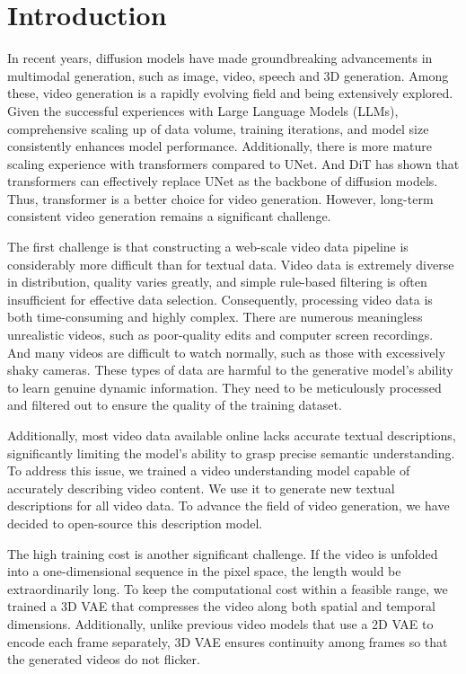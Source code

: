 \section{Introduction}

In recent years, diffusion models have made groundbreaking advancements in multimodal generation, such as image, video, speech and 3D generation. Among these, video generation is a rapidly evolving field and being extensively explored. Given the successful experiences with Large Language Models (LLMs), comprehensive scaling up of data volume, training iterations, and model size consistently enhances model performance. Additionally, there is more mature scaling experience with transformers compared to UNet. And DiT \citep{peebles2023scalable} has shown that transformers can effectively replace UNet as the backbone of diffusion models. Thus, transformer is a better choice for video generation.
However, long-term consistent video generation remains a significant challenge.  %

The first challenge is that constructing a web-scale video data pipeline is considerably more difficult than for textual data. Video data is extremely diverse in distribution, quality varies greatly, and simple rule-based filtering is often insufficient for effective data selection. Consequently, processing video data is both time-consuming and highly complex.
There are numerous meaningless unrealistic videos, such as poor-quality edits and computer screen recordings. And many videos are difficult to watch normally, such as those with excessively shaky cameras. These types of data are harmful to the generative model's ability to learn genuine dynamic information. They need to be meticulously processed and filtered out to ensure the quality of the training dataset.

Additionally, most video data available online lacks accurate textual descriptions, significantly limiting the model's ability to grasp precise semantic understanding. To address this issue, we trained a video understanding model capable of accurately describing video content. We use it to generate new textual descriptions for all video data. 
To advance the field of video generation, we have decided to open-source this description model.

The high training cost is another significant challenge. If the video is unfolded into a one-dimensional sequence in the pixel space, the length would be extraordinarily long. To keep the computational cost within a feasible range, we trained a 3D VAE that compresses the video along both spatial and temporal dimensions. Additionally,  unlike previous video models that use a 2D VAE to encode each frame separately, 3D VAE ensures continuity among frames so that the generated videos do not flicker. 

